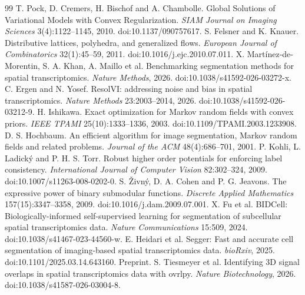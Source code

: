 \documentclass[10pt,letterpaper]{article}
\begin{document}
\begin{thebibliography}{99}
 T. Pock, D. Cremers, H. Bischof and A. Chambolle. Global Solutions of Variational Models with Convex Regularization. \emph{SIAM Journal on Imaging Sciences} 3(4):1122--1145, 2010. doi:10.1137/090757617.
 S. Felsner and K. Knauer. Distributive lattices, polyhedra, and generalized flows. \emph{European Journal of Combinatorics} 32(1):45--59, 2011. doi:10.1016/j.ejc.2010.07.011.
 X. Mart\'{i}nez-de-Morentin, S. A. Khan, A. Maillo et al. Benchmarking segmentation methods for spatial transcriptomics. \emph{Nature Methods}, 2026. doi:10.1038/s41592-026-03272-x.
 C. Ergen and N. Yosef. ResolVI: addressing noise and bias in spatial transcriptomics. \emph{Nature Methods} 23:2003--2014, 2026. doi:10.1038/s41592-026-03212-9.
 H. Ishikawa. Exact optimization for Markov random fields with convex priors. \emph{IEEE TPAMI} 25(10):1333--1336, 2003. doi:10.1109/TPAMI.2003.1233908.
 D. S. Hochbaum. An efficient algorithm for image segmentation, Markov random fields and related problems. \emph{Journal of the ACM} 48(4):686--701, 2001.
 P. Kohli, L. Ladick\'{y} and P. H. S. Torr. Robust higher order potentials for enforcing label consistency. \emph{International Journal of Computer Vision} 82:302--324, 2009. doi:10.1007/s11263-008-0202-0.
 S. \v{Z}ivn\'{y}, D. A. Cohen and P. G. Jeavons. The expressive power of binary submodular functions. \emph{Discrete Applied Mathematics} 157(15):3347--3358, 2009. doi:10.1016/j.dam.2009.07.001.
 X. Fu et al. BIDCell: Biologically-informed self-supervised learning for segmentation of subcellular spatial transcriptomics data. \emph{Nature Communications} 15:509, 2024. doi:10.1038/s41467-023-44560-w.
 E. Heidari et al. Segger: Fast and accurate cell segmentation of imaging-based spatial transcriptomics data. \emph{bioRxiv}, 2025. doi:10.1101/2025.03.14.643160. Preprint.
 S. Tiesmeyer et al. Identifying 3D signal overlaps in spatial transcriptomics data with ovrlpy. \emph{Nature Biotechnology}, 2026. doi:10.1038/s41587-026-03004-8.
\end{thebibliography}
\end{document}

